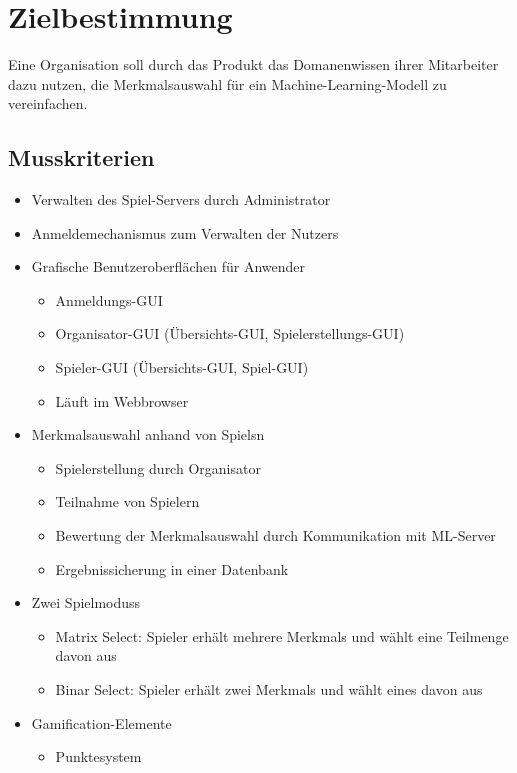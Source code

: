 \documentclass[a4paper]{scrreprt}
\begin{document}
    \chapter{Zielbestimmung}
    Eine Organisation soll durch das \Gls{Produkt} das \Gls{Domanenwissen} ihrer Mitarbeiter dazu nutzen, die Merkmalsauswahl für ein Machine-Learning-Modell zu vereinfachen.



    \section{Musskriterien}
    \begin{itemize} %
        \item Verwalten des \Gls{Spiel-Server}s durch \Gls{Administrator}
    	\item Anmeldemechanismus zum Verwalten der \Glspl{Nutzer}
	\item Grafische Benutzeroberflächen für Anwender 
        \begin{itemize}
            \item Anmeldungs-GUI
            \item Organisator-GUI (Übersichts-GUI, Spielerstellungs-GUI)
            \item Spieler-GUI (Übersichts-GUI, Spiel-GUI)
            \item Läuft im \Gls{Webbrowser}
        \end{itemize}
        \item Merkmalsauswahl anhand von \Glspl{Spiel}n  %
        \begin{itemize}
            \item Spielerstellung durch \Gls{Organisator}
            \item Teilnahme von \Gls{Spieler}n %
            \item Bewertung der Merkmalsauswahl durch Kommunikation mit \Gls{ML-Server}
            \item Ergebnissicherung in einer Datenbank 
        \end{itemize}
        \item Zwei \Glspl{Spielmodus}
        \begin{itemize}
            \item \Gls{Matrix Select}: \Gls{Spieler} erhält mehrere \Glspl{Merkmal} und wählt eine Teilmenge davon aus %
            \item \Gls{Binar Select}: \Gls{Spieler} erhält zwei \Glspl{Merkmal} und wählt eines davon aus
        \end{itemize}
        \item Gamification-Elemente
        \begin{itemize}
                  \item Punktesystem 
        \end{itemize}
    \end{itemize}
    \newpage %
\end{document}

